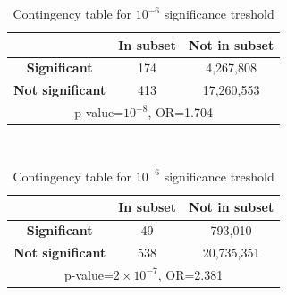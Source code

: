 \begin {table}
    \begin{subtable}{1\linewidth}
        \centering
        \caption{For 0.01 significance treshold}
        \begin{tabular}{c c c} 
            \hline
            &  \textbf{In subset} & \textbf{Not in subset} \\
             \hline
             \hline
             \textbf{Significant} & 174 & 4,267,808 \\ 
             \textbf{Not significant} & 413 & 17,260,553 \\
             \hline
            \multicolumn{3}{c}{p-value=$10^{-8}$, OR=1.704}\\
            \hline
        \end{tabular}
    \label{table:cont4}
    \end{subtable}
    ~\vspace*{1 cm}

     \begin{subtable}{1\linewidth}
        \centering
        \caption{Contingency table for $10^{-6}$ significance treshold}
         \begin{tabular}{c c c} 
            \hline
            &  \textbf{In subset} & \textbf{Not in subset} \\
             \hline
             \hline
             \textbf{Significant} & 49 & 793,010 \\ 
             \textbf{Not significant} & 538 & 20,735,351 \\
             \hline
            \multicolumn{3}{c}{p-value=$2\times 10^{-7}$, OR=2.381}\\
            \hline
        \end{tabular}
    \label{table:cont5}
     \end{subtable}
\end{table}




